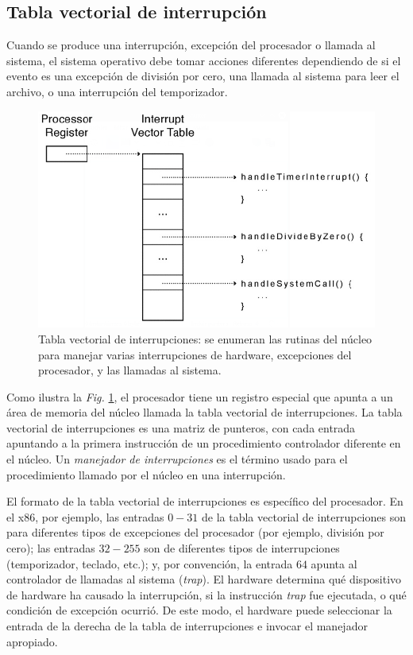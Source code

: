 \documentclass[10pt]{book}
\begin{document}
\subsection{Tabla vectorial de interrupción}
Cuando se produce una interrupción, excepción del procesador o llamada al sistema, el sistema operativo debe tomar acciones diferentes dependiendo de si el evento es una excepción de división por cero, una llamada al sistema para leer el archivo, o una interrupción del temporizador.
\begin{figure}[tbhp]
\centerline{\includegraphics[scale=0.55]{img/fig0204}}
\caption{Tabla vectorial de interrupciones: se enumeran las rutinas del núcleo para manejar varias interrupciones de hardware, excepciones del procesador, y las llamadas al sistema.}
\label{fig0204}
\end{figure}

Como ilustra la \textit{Fig.} \ref{fig0204}, el procesador tiene un registro especial que apunta a un área de memoria del núcleo llamada la tabla vectorial de interrupciones. La tabla vectorial de interrupciones es una matriz de punteros, con cada entrada apuntando a la primera instrucción de un procedimiento controlador diferente en el núcleo. Un \textit{manejador de interrupciones} es el término usado para el procedimiento llamado por el núcleo en una interrupción.

El formato de la tabla vectorial de interrupciones es específico del procesador. En el x86, por ejemplo, las entradas $0-31$ de la tabla vectorial de interrupciones son para diferentes tipos de excepciones del procesador (por ejemplo, división por cero); las entradas $32-255$ son de diferentes tipos de interrupciones (temporizador, teclado, etc.); y, por convención, la entrada $64$ apunta al controlador de llamadas al sistema (\textit{trap}). El hardware determina qué dispositivo de hardware ha causado la interrupción, si la instrucción \textit{trap} fue ejecutada, o qué condición de excepción ocurrió. De este modo, el hardware puede seleccionar la entrada de la derecha de la tabla de interrupciones e invocar el manejador apropiado.
\end{document}
